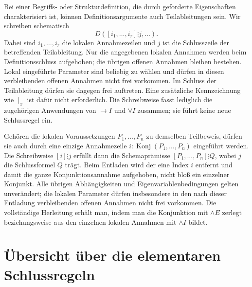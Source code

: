 \documentclass[main.tex]{subfiles}
\begin{document}
\begin{remark}
Bei einer Begriffs- oder Strukturdefinition, die durch geforderte
Eigenschaften charakterisiert ist, können Definitionsargumente auch
Teilableitungen sein. Wir schreiben schematisch
\[
  D([i_1,\dots,i_r]\vdots j,\dots).
\]
Dabei sind \(i_1,\dots,i_r\) die lokalen Annahmezeilen und \(j\)
ist die Schlusszeile der betreffenden Teilableitung. Nur die angegebenen
lokalen Annahmen werden beim Definitionsschluss aufgehoben; die übrigen
offenen Annahmen bleiben bestehen. Lokal eingeführte Parameter sind
beliebig zu wählen und dürfen in diesen verbleibenden offenen Annahmen
nicht frei vorkommen. Im Schluss der Teilableitung dürfen sie dagegen
frei auftreten. Eine zusätzliche Kennzeichnung wie \(\mid_x\) ist
dafür nicht erforderlich. Die Schreibweise fasst lediglich die zugehörigen
Anwendungen von \(\rightarrow I\) und \(\forall I\) zusammen;
sie führt keine neue Schlussregel ein.

Gehören die lokalen Voraussetzungen \(P_1,\ldots,P_n\) zu demselben
Teilbeweis, dürfen sie auch durch eine einzige Annahmezeile
\(i\colon\operatorname{Konj}(P_1,\ldots,P_n)\) eingeführt werden.
Die Schreibweise \([i]\vdots j\) erfüllt dann die Schemaprämisse
\([P_1,\ldots,P_n]\vdots Q\), wobei \(j\) die Schlussformel \(Q\)
trägt. Beim Entladen wird der eine Index \(i\) entfernt und damit die
ganze Konjunktionsannahme aufgehoben, nicht bloß ein einzelner Konjunkt.
Alle übrigen Abhängigkeiten und Eigenvariablenbedingungen gelten
unverändert; die lokalen Parameter dürfen insbesondere in den nach
dieser Entladung verbleibenden offenen Annahmen nicht frei vorkommen.
Die vollständige Herleitung erhält man, indem man die Konjunktion
mit \(\land E\) zerlegt beziehungsweise aus den einzelnen lokalen
Annahmen mit \(\land I\) bildet.
\end{remark}


\section{Übersicht über die elementaren Schlussregeln}
\end{document}
